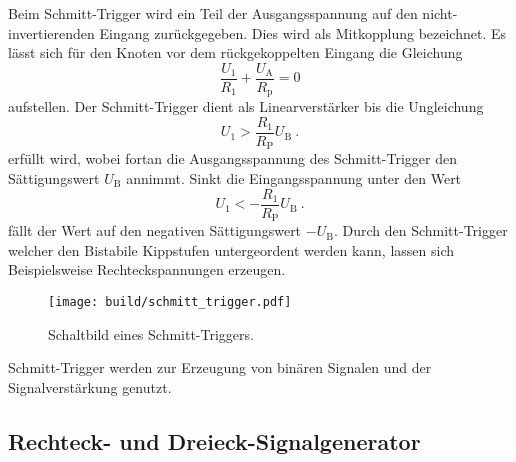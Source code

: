 Beim Schmitt-Trigger wird ein Teil der Ausgangsspannung auf den
nicht-invertierenden Eingang zurückgegeben.
Dies wird als Mitkopplung bezeichnet.
Es lässt sich für den Knoten vor dem rückgekoppelten Eingang die Gleichung
\begin{equation}
		\frac{U_1}{R_1} + \frac{U_\text{A}}{R_\text{p}} = 0
\end{equation}
aufstellen.
Der Schmitt-Trigger dient als Linearverstärker bis die Ungleichung
\begin{equation}
		\label{eq:schmitt}
		U_1 > \frac{R_1}{R_\text{P}} U_\text{B} \ .
\end{equation}
erfüllt wird, wobei fortan die Ausgangsspannung des Schmitt-Trigger den
Sättigungswert $U_\text{B}$ annimmt. 
Sinkt die Eingangsspannung unter den Wert 
\begin{equation}
		\label{eq:m_ub}
		U_1 < - \frac{R_1}{R_\text{P}} U_\text{B} \ .
\end{equation}
fällt der Wert auf den negativen Sättigungswert $-U_\text{B}$.
Durch den Schmitt-Trigger welcher den Bistabile Kippstufen untergeordent werden
kann, lassen sich Beispielsweise Rechteckspannungen erzeugen.
\begin{figure}[ht]
		\centering
		\texttt{[image: build/schmitt\_trigger.pdf]}
		\caption{Schaltbild eines Schmitt-Triggers. \cite{anleitung}}
    \label{fig:schmitt_theo}
\end{figure}
Schmitt-Trigger werden zur Erzeugung von binären Signalen und der
Signalverstärkung genutzt.

\subsection{Rechteck- und Dreieck-Signalgenerator}%
\label{sub:signalgenerator}

